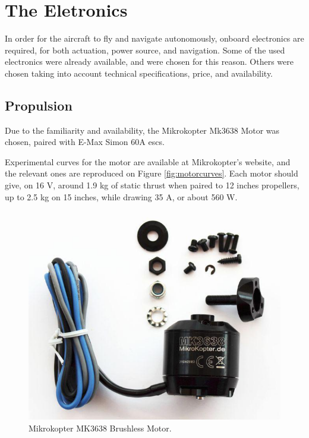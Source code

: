 
\chapter{The Eletronics} \label{chap:electronics}

In order for the aircraft to fly and navigate autonomously, onboard electronics are required, for both actuation, power source, and navigation. Some of the used electronics were already available, and were chosen for this reason. Others were chosen taking into account technical specifications, price, and availability.
	
\section{Propulsion}

Due to the familiarity and availability, the Mikrokopter Mk3638 Motor was chosen, paired with E-Max Simon 60A escs.

Experimental curves for the motor are available at Mikrokopter's website, and the relevant ones are reproduced on Figure \ref{fig:motorcurves}. Each motor should give, on 16 V, around 1.9 kg of static thrust when paired to 12 inches propellers, up to 2.5 kg on 15 inches, while drawing 35 A, or about 560 W.

\begin{figure}[H]
\centering
  \includegraphics[width=0.8\linewidth]{figs/mk3638.jpg}
  \caption{Mikrokopter MK3638 Brushless Motor.}
  \label{fig:mk3638}
\end{figure}

